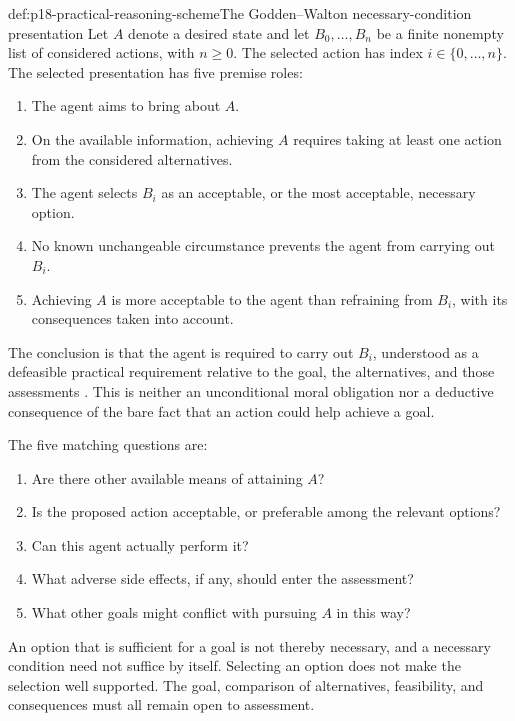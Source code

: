 \begin{hbdefinition}{def:p18-practical-reasoning-scheme}{The Godden--Walton necessary-condition presentation}
Let \(A\) denote a desired state and let \(B_0,\ldots,B_n\) be a finite
nonempty list of considered actions, with \(n\geq0\).
The selected action has index \(i\in\{0,\ldots,n\}\).
The selected presentation has five premise roles:
\begin{enumerate}
\item The agent aims to bring about \(A\).
\item On the available information, achieving \(A\) requires taking
at least one action from the considered alternatives.
\item The agent selects \(B_i\) as an acceptable, or the most acceptable,
necessary option.
\item No known unchangeable circumstance prevents the agent from
carrying out \(B_i\).
\item Achieving \(A\) is more acceptable to the agent than refraining
from \(B_i\), with its consequences taken into account.
\end{enumerate}
The conclusion is that the agent is required to carry out \(B_i\),
understood as a defeasible practical requirement relative to the goal,
the alternatives, and those assessments
\cite[pp.~285--287]{GoddenWalton2007SchemesQuestions}.
This is neither an unconditional moral obligation nor a deductive
consequence of the bare fact that an action could help achieve a goal.
\end{hbdefinition}

The five matching questions are:

\begin{enumerate}
\item Are there other available means of attaining \(A\)?
\item Is the proposed action acceptable, or preferable among the
relevant options?
\item Can this agent actually perform it?
\item What adverse side effects, if any, should enter the assessment?
\item What other goals might conflict with pursuing \(A\) in this way?
\end{enumerate}

An option that is sufficient for a goal is not thereby necessary,
and a necessary condition need not suffice by itself.
Selecting an option does not make the selection well supported.
The goal, comparison of alternatives, feasibility, and consequences
must all remain open to assessment.

